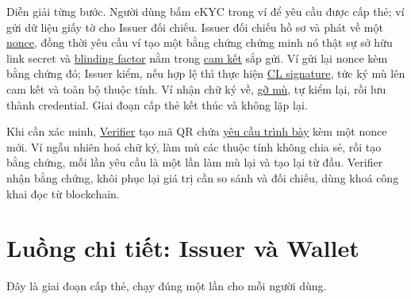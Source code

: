 \documentclass[a4paper,11pt,oneside]{report}
\theoremstyle{definition}
\theoremstyle{plain}
\newcommand{\g}[2]{\hyperref[term:#1]{#2}}
\begin{document}
Diễn giải từng bước. Người dùng bấm eKYC trong ví để yêu cầu được cấp thẻ; ví gửi dữ
liệu giấy tờ cho Issuer đối chiếu. Issuer đối chiếu hồ sơ và phát về một
\g{nonce}{nonce}, đồng thời yêu cầu ví tạo một bằng chứng chứng minh nó thật sự sở hữu
link secret và \g{blinding}{blinding factor} nằm trong \g{commitment}{cam kết}
sắp gửi. Ví gửi lại nonce kèm bằng chứng đó; Issuer kiểm, nếu hợp lệ thì thực hiện
\g{clsig}{CL signature}, tức ký mù lên cam kết và toàn bộ thuộc tính. Ví nhận chữ
ký về, \g{unblind}{gỡ mù}, tự kiểm lại, rồi lưu thành credential. Giai đoạn cấp
thẻ kết thúc và không lặp lại.

Khi cần xác minh, \g{verifier}{Verifier} tạo mã QR chứa \g{presreq}{yêu cầu trình bày} kèm một
nonce mới. Ví ngẫu nhiên hoá chữ ký, làm mù các thuộc tính không chia sẻ, rồi tạo
bằng chứng, mỗi lần yêu cầu là một lần làm mù lại và tạo lại từ đầu. Verifier nhận bằng chứng,
khôi phục lại giá trị cần so sánh và đối chiếu, dùng khoá công khai đọc từ
blockchain.

\section{Luồng chi tiết: Issuer và Wallet}
\label{sec:flow-iw}

Đây là giai đoạn cấp thẻ, chạy đúng một lần cho mỗi người dùng.

\begin{center}
\end{center}
\end{document}
